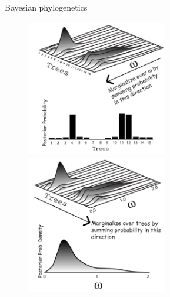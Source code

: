 \documentclass[newPxFont,numfooter,sectionpages]{beamer}
\begin{document}
\begin{frame}{Bayesian phylogenetics}
\vspace{2em}
\begin{figure}
	\centerline{
	\includegraphics[width=0.55\textwidth,height=6cm]{figures/Joint_trees_omega_marg1.pdf} \\ 
	\includegraphics[width=0.55\textwidth,height=6cm]{figures/Joint_trees_omega_marg2.pdf}
	}
\end{figure}
\end{frame}
\end{document}
